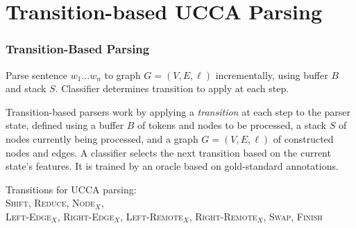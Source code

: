 \documentclass[t]{beamer}
\begin{document}
\section{Transition-based UCCA Parsing}

\begin{frame}
\frametitle{Transition-Based Parsing}
Parse sentence $w_1 \ldots w_n$ to graph $G=(V,E,\ell)$ incrementally, using buffer $B$ and stack $S$.
Classifier determines transition to apply at each step.

\vfill
\pause

Transition-based parsers work by applying a \textit{transition}
at each step to the parser state,
defined using a buffer $B$ of tokens and nodes to be processed,
a stack $S$ of nodes currently being processed,
and a graph $G=(V,E,\ell)$ of constructed nodes and edges.
A classifier selects the next transition based on the current state's features.
It is trained by an oracle based on gold-standard annotations.

\pause
\begin{center}
\end{center}

\vfill
\pause
Transitions for UCCA parsing:\\
\textsc{Shift, Reduce, Node$_X$,}\\
\textsc{Left-Edge$_X$, Right-Edge$_X$, Left-Remote$_X$, Right-Remote$_X$,}
\textsc{Swap, Finish}
\end{frame}
\end{document}
